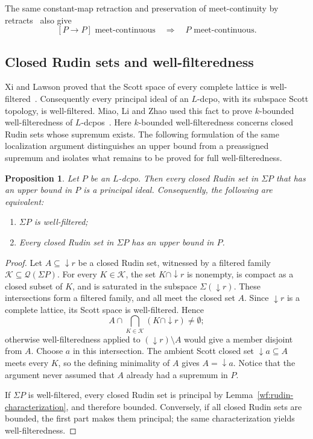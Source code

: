 \documentclass[10pt,a4paper]{article}
\newtheorem{proposition}[theorem]{Proposition}
\theoremstyle{definition}
\begin{document}
The same constant-map retraction and preservation of meet-continuity by retracts~\cite[Proposition~3.1.7]{Jia} also give
\[
 [P\to P]\text{ meet-continuous}\quad\Longrightarrow\quad P\text{ meet-continuous}.
\]

\subsection{Closed Rudin sets and well-filteredness}\label{local:subsec:rudin}
Xi and Lawson proved that the Scott space of every complete lattice is well-filtered~\cite{XiLawson}. Consequently every principal ideal of an $L$-dcpo, with its subspace Scott topology, is well-filtered. Miao, Li and Zhao used this fact to prove $k$-bounded well-filteredness of $L$-dcpos~\cite[Lemma~4.6 and Theorem~4.8]{MLZ}. Here $k$-bounded well-filteredness concerns closed Rudin sets whose supremum exists. The following formulation of the same localization argument distinguishes an upper bound from a preassigned supremum and isolates what remains to be proved for full well-filteredness.

\begin{proposition}\label{local:rudin-boundedness}
Let $P$ be an $L$-dcpo. Then every closed Rudin set in $\Sigma P$ that has an upper bound in $P$ is a principal ideal. Consequently, the following are equivalent:
\begin{enumerate}[\rm (1)]
\item $\Sigma P$ is well-filtered;
\item Every closed Rudin set in $\Sigma P$ has an upper bound in $P$.
\end{enumerate}
\end{proposition}
\begin{proof}
Let $A\subseteq{\downarrow} r$ be a closed Rudin set, witnessed by a filtered family $\mathcal K\subseteq\mathcal Q(\Sigma P)$. For every $K\in\mathcal K$, the set $K\cap{\downarrow} r$ is nonempty, is compact as a closed subset of $K$, and is saturated in the subspace $\Sigma({\downarrow} r)$. These intersections form a filtered family, and all meet the closed set $A$. Since ${\downarrow} r$ is a complete lattice, its Scott space is well-filtered. Hence
\[
 A\cap\bigcap_{K\in\mathcal K}(K\cap{\downarrow} r)\ne\emptyset;
\]
otherwise well-filteredness applied to $({\downarrow} r)\setminus A$ would give a member disjoint from $A$. Choose $a$ in this intersection. The ambient Scott closed set ${\downarrow} a\subseteq A$ meets every $K$, so the defining minimality of $A$ gives $A={\downarrow} a$. Notice that the argument never assumed that $A$ already had a supremum in $P$.

If $\Sigma P$ is well-filtered, every closed Rudin set is principal by Lemma~\ref{wf:rudin-characterization}, and therefore bounded. Conversely, if all closed Rudin sets are bounded, the first part makes them principal; the same characterization yields well-filteredness.
\end{proof}
\end{document}
